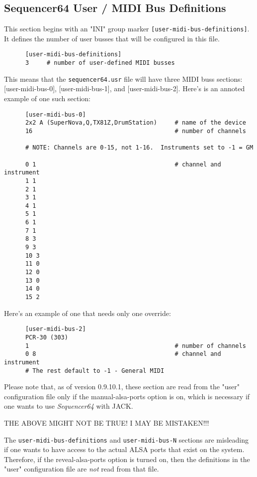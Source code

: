 \subsection{Sequencer64 User / MIDI Bus Definitions}
\label{subsec:seq64_usr_file_midi_bus_definitions}

   This section begins with an
   "INI" group marker \texttt{[user-midi-bus-definitions]}.
   It defines the number of user busses that will be configured in this file.

   \begin{verbatim}
      [user-midi-bus-definitions]
      3     # number of user-defined MIDI busses
   \end{verbatim}

   This means that the \texttt{sequencer64.usr} file will have three MIDI buss
   sections: [user-midi-bus-0], [user-midi-bus-1], and [user-midi-bus-2].
   Here's is an annoted example of one such section:

   \begin{verbatim}
      [user-midi-bus-0]
      2x2 A (SuperNova,Q,TX81Z,DrumStation)     # name of the device
      16                                        # number of channels

      # NOTE: Channels are 0-15, not 1-16.  Instruments set to -1 = GM

      0 1                                       # channel and instrument
      1 1 
      2 1
      3 1
      4 1
      5 1
      6 1
      7 1
      8 3
      9 3
      10 3
      11 0
      12 0
      13 0
      14 0
      15 2
   \end{verbatim}

   Here's an example of one that needs only one override:

   \begin{verbatim}
      [user-midi-bus-2]
      PCR-30 (303)
      1                                         # number of channels
      0 8                                       # channel and instrument
      # The rest default to -1 - General MIDI
   \end{verbatim}

   Please note that, as of version 0.9.10.1, these section are read from the
   "user" configuration file only if
   the manual-alsa-ports option is on, which is necessary if one
   wants to use \textsl{Sequencer64} with JACK.

   THE ABOVE MIGHT NOT BE TRUE!  I MAY BE MISTAKEN!!!

   The \texttt{user-midi-bus-definitions} and \texttt{user-midi-bus-N} sections
   are misleading if one wants to have access to the
   actual ALSA ports that exist on the system.
   Therefore, if the reveal-alsa-ports option is turned on, then the
   definitions in the "user" configuration file are \textsl{not} read from that
   file.

